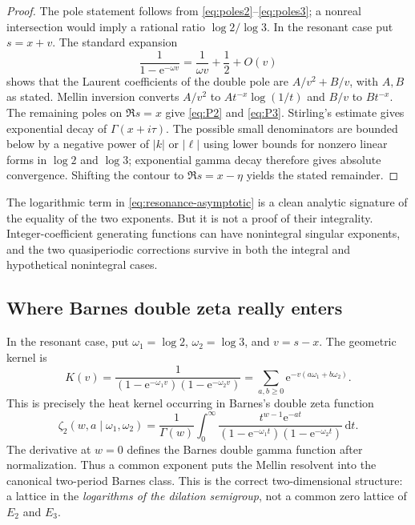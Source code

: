 \documentclass[11pt]{article}
\numberwithin{equation}{section}
\theoremstyle{definition}
\theoremstyle{remark}
\newcommand{\e}{\mathrm{e}}
\newcommand{\dd}{\,\mathrm{d}}
\begin{document}
\begin{proof}
The pole statement follows from \eqref{eq:poles2}--\eqref{eq:poles3}; a nonreal intersection would imply a rational ratio $\log2/\log3$.  In the resonant case put $s=x+v$.  The standard expansion
\[
 \frac1{1-\e^{-\omega v}}=\frac1{\omega v}+\frac12+O(v)
\]
shows that the Laurent coefficients of the double pole are $A/v^2+B/v$, with $A,B$ as stated.  Mellin inversion converts $A/v^2$ to $At^{-x}\log(1/t)$ and $B/v$ to $Bt^{-x}$.  The remaining poles on $\Re s=x$ give \eqref{eq:P2} and \eqref{eq:P3}.  Stirling's estimate gives exponential decay of $\Gamma(x+i\tau)$.  The possible small denominators are bounded below by a negative power of $|k|$ or $|\ell|$ using lower bounds for nonzero linear forms in $\log2$ and $\log3$; exponential gamma decay therefore gives absolute convergence.  Shifting the contour to $\Re s=x-\eta$ yields the stated remainder.
\end{proof}

The logarithmic term in \eqref{eq:resonance-asymptotic} is a clean analytic signature of the equality of the two exponents.  But it is not a proof of their integrality.  Integer-coefficient generating functions can have nonintegral singular exponents, and the two quasiperiodic corrections survive in both the integral and hypothetical nonintegral cases.

\subsection{Where Barnes double zeta really enters}
In the resonant case, put $\omega_1=\log2$, $\omega_2=\log3$, and $v=s-x$.  The geometric kernel is
\begin{equation}
 K(v)=\frac1{(1-\e^{-\omega_1v})(1-\e^{-\omega_2v})}
 =\sum_{a,b\ge0}\e^{-v(a\omega_1+b\omega_2)}.
 \label{eq:Barnes-kernel}
\end{equation}
This is precisely the heat kernel occurring in Barnes's double zeta function
\begin{equation}
 \zeta_2(w,a\mid\omega_1,\omega_2)
 =\frac1{\Gamma(w)}\int_0^\infty
 \frac{t^{w-1}\e^{-at}}{(1-\e^{-\omega_1t})(1-\e^{-\omega_2t})}\dd t.
 \label{eq:Barnes-zeta}
\end{equation}
The derivative at $w=0$ defines the Barnes double gamma function after normalization.  Thus a common exponent puts the Mellin resolvent into the canonical two-period Barnes class.  This is the correct two-dimensional structure: a lattice in the \emph{logarithms of the dilation semigroup}, not a common zero lattice of $E_2$ and $E_3$.
\end{document}

